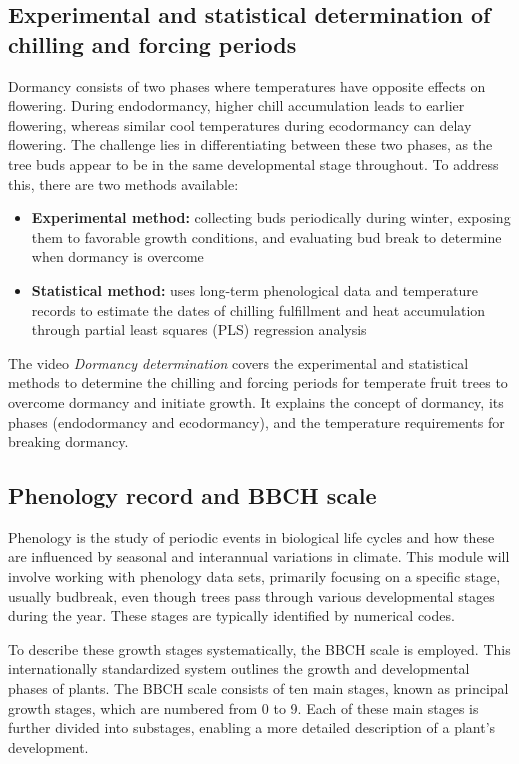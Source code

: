 \documentclass[
]{article}
\begin{document}
\subsection{Experimental and statistical determination of chilling and forcing periods}\label{experimental-and-statistical-determination-of-chilling-and-forcing-periods}

Dormancy consists of two phases where temperatures have opposite effects on flowering. During endodormancy, higher chill accumulation leads to earlier flowering, whereas similar cool temperatures during ecodormancy can delay flowering. The challenge lies in differentiating between these two phases, as the tree buds appear to be in the same developmental stage throughout. To address this, there are two methods available:

\begin{itemize}
\item
  \textbf{Experimental method:} collecting buds periodically during winter, exposing them to favorable growth conditions, and evaluating bud break to determine when dormancy is overcome
\item
  \textbf{Statistical method:} uses long-term phenological data and temperature records to estimate the dates of chilling fulfillment and heat accumulation through partial least squares (PLS) regression analysis
\end{itemize}

The video \emph{Dormancy determination} covers the experimental and statistical methods to determine the chilling and forcing periods for temperate fruit trees to overcome dormancy and initiate growth. It explains the concept of dormancy, its phases (endodormancy and ecodormancy), and the temperature requirements for breaking dormancy.

\subsection{Phenology record and BBCH scale}\label{phenology-record-and-bbch-scale}

Phenology is the study of periodic events in biological life cycles and how these are influenced by seasonal and interannual variations in climate. This module will involve working with phenology data sets, primarily focusing on a specific stage, usually budbreak, even though trees pass through various developmental stages during the year. These stages are typically identified by numerical codes.

To describe these growth stages systematically, the BBCH scale is employed. This internationally standardized system outlines the growth and developmental phases of plants. The BBCH scale consists of ten main stages, known as principal growth stages, which are numbered from 0 to 9. Each of these main stages is further divided into substages, enabling a more detailed description of a plant's development.
\end{document}
